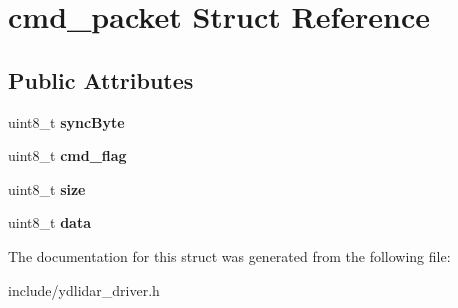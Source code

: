 \hypertarget{structcmd__packet}{}\section{cmd\+\_\+packet Struct Reference}
\label{structcmd__packet}
\subsection*{Public Attributes}
\begin{DoxyCompactItemize}
\item 
uint8\+\_\+t {\bfseries sync\+Byte}\hypertarget{structcmd__packet_afbbf12329459d281e93fc742d1a78009}{}\label{structcmd__packet_afbbf12329459d281e93fc742d1a78009}

\item 
uint8\+\_\+t {\bfseries cmd\+\_\+flag}\hypertarget{structcmd__packet_a87508f8232c382897c9159026985f3eb}{}\label{structcmd__packet_a87508f8232c382897c9159026985f3eb}

\item 
uint8\+\_\+t {\bfseries size}\hypertarget{structcmd__packet_aff384923e9d1d54d526ca755529eac05}{}\label{structcmd__packet_aff384923e9d1d54d526ca755529eac05}

\item 
uint8\+\_\+t {\bfseries data}\hypertarget{structcmd__packet_a3b8820a6357e147dd00ea67d9c9484c0}{}\label{structcmd__packet_a3b8820a6357e147dd00ea67d9c9484c0}

\end{DoxyCompactItemize}


The documentation for this struct was generated from the following file\+:\begin{DoxyCompactItemize}
\item 
include/ydlidar\+\_\+driver.\+h\end{DoxyCompactItemize}
